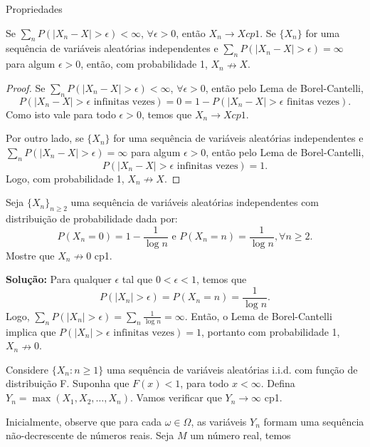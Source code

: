 %
\begin{frame}{Propriedades}
%
\begin{teo}
Se $\sum_n P(|X_n-X|>\epsilon)<\infty$, $\forall \epsilon>0$, então $X_n\rightarrow X cp1$. Se $\{X_n\}$ for uma sequência de variáveis aleatórias independentes e $\sum_n P(|X_n-X|>\epsilon)=\infty$ para algum $\epsilon>0$, então, com probabilidade 1, $X_n\nrightarrow X$.
\end{teo}
%
\begin{proof}
Se $\sum_n P(|X_n-X|>\epsilon)<\infty$, $\forall \epsilon>0$, então pelo Lema de Borel-Cantelli,
$$P(|X_n-X|>\epsilon \mbox{ infinitas vezes})=0=1-P(|X_n-X|>\epsilon \mbox{ finitas vezes}).$$
Como isto vale para todo $\epsilon>0$, temos que $X_n\rightarrow X cp1$.

Por outro lado, se $\{X_n\}$ for uma sequência de variáveis aleatórias independentes e $\sum_n P(|X_n-X|>\epsilon)=\infty$ para algum $\epsilon>0$, então pelo Lema de Borel-Cantelli,
$$P(|X_n-X|>\epsilon \mbox{ infinitas vezes})=1.$$
Logo, com probabilidade 1, $X_n\nrightarrow X$.
\end{proof}
%
\end{frame}
%
%
\begin{frame}
%
\begin{exem}
\label{exemp:divcp1}
Seja $\{X_n\}_{n\geq 2}$ uma sequência de variáveis aleatórias independentes com distribuição de probabilidade dada por:
$$P(X_n=0)=1-\frac{1}{\log n}\mbox{ e }P(X_n=n)=\frac{1}{\log n}, \forall n\geq 2.$$
Mostre que $X_n\nrightarrow 0$ cp1.

{\bf Solução:} Para qualquer $\epsilon$ tal que $0<\epsilon<1$, temos que
$$P(|X_n|>\epsilon)=P(X_n=n)=\frac{1}{\log n}.$$
Logo, $\sum_n P(|X_n|>\epsilon)=\sum_n \frac{1}{\log n}=\infty$. Então, o Lema de Borel-Cantelli implica que $P(|X_n|>\epsilon \mbox{ infinitas vezes})=1$, portanto com probabilidade 1, $X_n\nrightarrow 0$.
\end{exem}
%
%
%
%
\begin{exem}
Considere $\{X_n:n\geq 1\}$ uma sequência de variáveis aleatórias
i.i.d. com função de distribuição F. Suponha que $F(x)<1$, para todo
$x<\infty$. Defina $Y_n=\max(X_1,X_2,\ldots,X_n)$. Vamos verificar
que $Y_n\rightarrow \infty$ cp1.

Inicialmente, observe que para cada $\omega\in\Omega$, as variáveis
$Y_n$ formam uma sequência não-decrescente de números reais. Seja
$M$ um número real, temos
%
\end{exem}
\end{frame}
